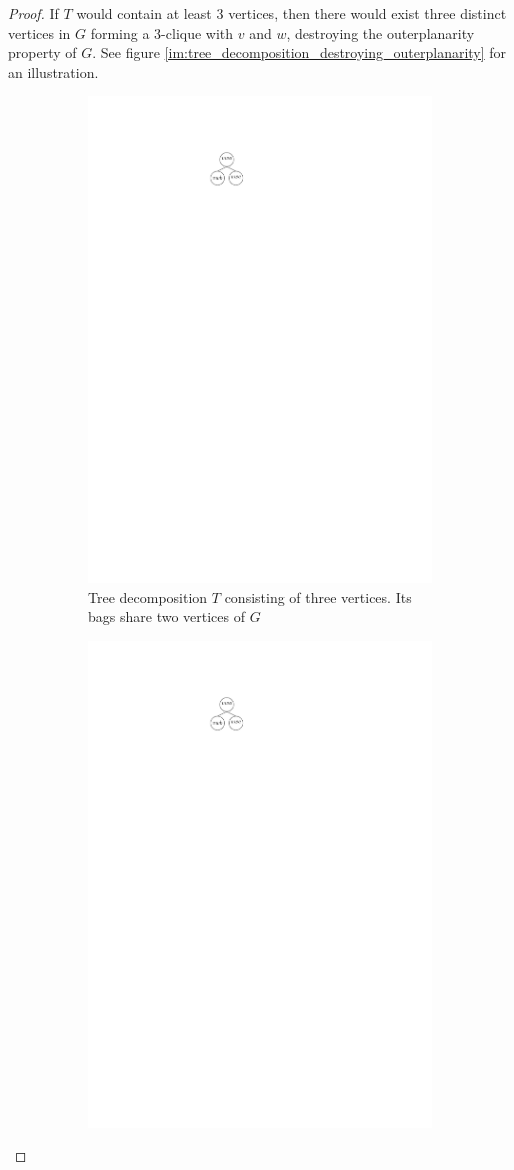 \begin{proof}
	If $T$ would contain at least 3 vertices, then there would exist three distinct vertices in $G$ forming a 3-clique with $v$ and $w$, destroying the outerplanarity property of $G$. See figure \ref{im:tree_decomposition_destroying_outerplanarity} for an illustration.
			\begin{figure}[H]
		\centering
		\begin{subfigure}{0.45\textwidth}
			\centering
			\includegraphics[page=1,width=0.8\linewidth]{graphics/maximal_outerplanar_tree_decomposition.pdf}
			\caption{Tree decomposition $T$ consisting of three vertices. Its bags share two vertices of $G$}
		\end{subfigure}
	\begin{subfigure}{0.45\textwidth}
	\centering
	\includegraphics[page=2,width=0.45\linewidth]{graphics/maximal_outerplanar_tree_decomposition.pdf}

\end{subfigure}
\end{figure}
\end{proof}
